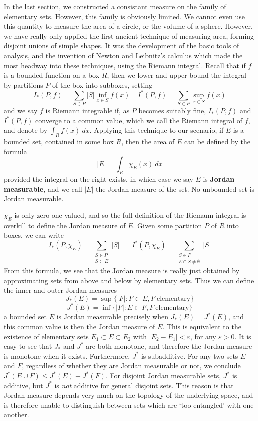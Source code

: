 In the last section, we constructed a consistant measure on the family of elementary sets. However, this family is obviously limited. We cannot even use this quantity to measure the area of a circle, or the volume of a sphere. However, we have really only applied the first ancient technique of measuring area, forming disjoint unions of simple shapes. It was the development of the basic tools of analysis, and the invention of Newton and Leibnitz's calculus which made the most headway into these techniques, using the Riemann integral. Recall that if $f$ is a bounded function on a box $R$, then we lower and upper bound the integral by partitions $P$ of the box into subboxes, setting
%
\[ I_*(P,f) = \sum_{S \in P} |S| \inf_{x \in S} f(x)\ \ \ \ \ I^*(P,f) = \sum_{S \in P} \sup_{x \in S} f(x) \]
%
and we say $f$ is Riemann integrable if, as $P$ becomes suitably fine, $I_*(P,f)$ and $I^*(P,f)$ converge to a common value, which we call the Riemann integral of $f$, and denote by $\int_R f(x)\ dx$. Applying this technique to our scenario, if $E$ is a bounded set, contained in some box $R$, then the area of $E$ can be defined by the formula
%
\[ |E| = \int_R \chi_E(x)\ dx \]
%
provided the integral on the right exists, in which case we say $E$ is {\bf Jordan measurable}, and we call $|E|$ the Jordan measure of the set. No unbounded set is Jordan measurable.

$\chi_E$ is only zero-one valued, and so the full definition of the Riemann integral is overkill to define the Jordan measure of $E$. Given some partition $P$ of $R$ into boxes, we can write
%
\[ I_*(P,\chi_E) = \sum_{\substack{S \in P\\S \subset E}} |S|\ \ \ \ \ \ \ \ I^*(P,\chi_E) = \sum_{\substack{S \in P\\E \cap S \neq \emptyset}} |S| \]
%
From this formula, we see that the Jordan measure is really just obtained by approximating sets from above and below by elementary sets. Thus we can define the inner and outer Jordan measures
%
\[ J_*(E) = \sup \{ |F| : F \subset E, F\ \text{elementary} \} \]
\[ J^*(E) = \inf \{ |F| : E \subset F, F\ \text{elementary} \} \]
%
a bounded set $E$ is Jordan measurable precisely when $J_*(E) = J^*(E)$, and this common value is then the Jordan measure of $E$. This is equivalent to the existence of elementary sets $E_1 \subset E \subset E_2$ with $|E_2 - E_1| < \varepsilon$, for any $\varepsilon > 0$. It is easy to see that $J_*$ and $J^*$ are both monotone, and therefore the Jordan measure is monotone when it exists. Furthermore, $J^*$ is subadditive. For any two sets $E$ and $F$, regardless of whether they are Jordan measurable or not, we conclude $J^*(E \cup F) \leq J^*(E) + J^*(F)$. For disjoint Jordan measurable sets, $J^*$ is additive, but $J^*$ is {\it not} additive for general disjoint sets. This reason is that Jordan measure depends very much on the topology of the underlying space, and is therefore unable to distinguish between sets which are `too entangled' with one another.

